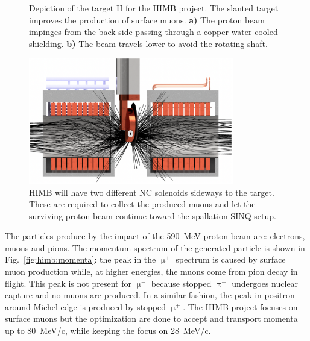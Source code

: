 \begin{refsection}
\begin{figure}
{            \label{fig:himb:target:a}}
            \caption[HIMB: H target]{Depiction of the target H for the HIMB project. The slanted target improves the production of surface muons. \textbf{a)} The proton beam impinges from the back side passing through a copper water-cooled shielding. \textbf{b)} The beam travels lower to avoid the rotating shaft.}
            \label{fig:himb:target}
        \end{figure}


        \begin{figure}
            \centering
            \includegraphics[width=0.8\textwidth]{Figures/Introduction/himb_solenoids.png}
            \caption[HIMB: collection solenoids]{HIMB will have two different NC solenoids sideways to the target. These are required to collect the produced muons and let the surviving proton beam continue toward the spallation SINQ setup.}
            \label{fig:himb:solenoids}
        \end{figure}

        \noindent
        The particles produce by the impact of the \SI{590}{MeV} proton beam are: electrons, muons and pions.
        The momentum spectrum of the generated particle is shown in Fig.~\ref{fig:himb:momenta}: the peak in the $\upmu^+$ spectrum is caused by surface muon production while, at higher energies, the muons come from pion decay in flight. 
        This peak is not present for $\upmu^-$ because stopped $\uppi^-$ undergoes nuclear capture and no muons are produced.  
        In a similar fashion, the peak in positron around Michel edge is produced by stopped $\upmu^+$.
        The HIMB project focuses on surface muons but the optimization are done to accept and transport momenta up to \SI{80}{MeV/c}, while keeping the focus on \SI{28}{MeV/c}.
        

\end{refsection}
